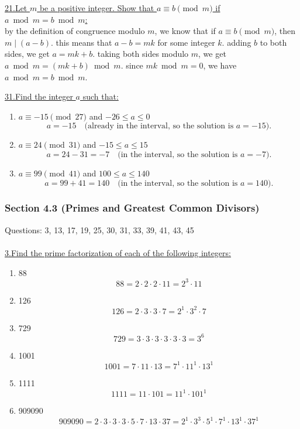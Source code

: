 \documentclass[12pt]{article}
\begin{document}
\vspace{5mm}
\noindent\underline{21.Let $m$ be a positive integer. Show that $a \equiv b \pmod{m}$ if $a \bmod m = b \bmod m$:}
\\\indent by the definition of congruence modulo $m$, we know that if $a \equiv b \pmod{m}$, then $m \mid (a-b)$.
 this means that $a-b = mk$ for some integer $k$.
 adding $b$ to both sides, we get $a = mk + b$.
 taking both sides modulo $m$, we get $a \bmod m = (mk + b) \bmod m$.
 since $mk \bmod m = 0$, we have $a \bmod m = b \bmod m$.

\vspace{5mm}

\noindent\underline{31.Find the integer $a$ such that:}
\begin{enumerate}[label=(\alph*)]
    \item $a \equiv -15 \pmod{27}$ and $-26 \leq a \leq 0$
\[
a = -15 \quad \text{(already in the interval, so the solution is $a=-15$).}
\]

\item $a \equiv 24 \pmod{31}$ and $-15 \leq a \leq 15$
\[
a = 24 - 31 = -7 \quad \text{(in the interval, so the solution is $a=-7$).}
\]

\item $a \equiv 99 \pmod{41}$ and $100 \leq a \leq 140$
\[
a = 99 + 41 = 140 \quad \text{(in the interval, so the solution is $a=140$).}
\]

\end{enumerate}



\newpage
\subsubsection*{Section 4.3 (Primes and Greatest Common Divisors)}
Questions: 3, 13, 17, 19, 25, 30, 31, 33, 39, 41, 43, 45
\\\\

\noindent\underline{3.Find the prime factorization of each of the following integers:}
\begin{enumerate}[label=(\alph*)]
    \item 88
    \[
    88 = 2 \cdot 2 \cdot 2 \cdot 11 = 2^3 \cdot 11
    \]
    \item 126
    \[
    126 = 2 \cdot 3 \cdot 3 \cdot 7 = 2^1 \cdot 3^2 \cdot 7
    \]
    \item 729
    \[
    729 = 3 \cdot 3 \cdot 3 \cdot 3 \cdot 3 \cdot 3 = 3^6
    \]
    \item 1001
    \[
    1001 = 7 \cdot 11 \cdot 13 = 7^1 \cdot 11^1 \cdot 13^1
    \]
    \item 1111
    \[
    1111 = 11 \cdot 101 = 11^1 \cdot 101^1
    \]
    \item 909090
    \[
    909090 = 2 \cdot 3 \cdot 3 \cdot 3 \cdot 5 \cdot 7  \cdot 13 \cdot 37 = 2^1 \cdot 3^3 \cdot 5^1 \cdot 7^1  \cdot 13^1 \cdot 37^1
    \]
\end{enumerate}
\end{document}
